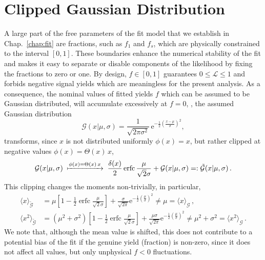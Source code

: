 \chapter{Clipped Gaussian Distribution}
\label{chap:apdx_clipgaus}
A large part of the free parameters of the fit model that we establish in Chap.~\ref{chap:fit} are fractions, such as $f_1$ and $f_s$, which are physically constrained to the interval $[0,1]$.
These boundaries enhance the numerical stability of the fit and makes it easy to separate or disable components of the likelihood by fixing the fractions to zero or one.
By design, $f \in [0,1]$ guarantees $0 \le \mathcal{L} \le 1$ and forbids negative signal yields which are meaningless for the present analysis.
As a consequence, the nominal values of fitted yields $f$ which can be assumed to be Gaussian distributed, will accumulate excessively at $f=0$, \ie{}, the assumed Gaussian distribution
\begin{equation*}
    \mathcal{G}(x|\mu,\sigma) = \frac{1}{\sqrt{2 \pi \sigma^2}} \, \mathrm{e}^{-\frac{1}{2} \left( \frac{x - \mu}{\sigma} \right)^2},
\end{equation*}
transforms, since $x$ is not distributed uniformly $\phi(x)=x$, but rather clipped at negative values $\phi(x) = \Theta(x) \, x$,
\begin{equation*}
    \mathcal{G}(x|\mu, \sigma) \; \xmapsto{\phi(x) = \Theta(x) \, x} \; \frac{\delta(x)}{2} \operatorname{erfc} \frac{\mu}{\sqrt{2}\sigma} + \mathcal{G}(x|\mu, \sigma) =: \tilde{\mathcal{G}}(x|\mu, \sigma) \,.
\end{equation*}
This clipping changes the moments non-trivially, in particular,
\begin{align}
    \langle x \rangle_{\tilde{\mathcal{G}}} &= \mu \left[ 1- \frac{1}{2} \operatorname{erfc} \frac{\mu}{\sqrt{2}\sigma} \right] + \frac{\sigma}{\sqrt{2 \pi}} \mathrm{e}^{-\frac{1}{2} \left( \frac{\mu}{\sigma} \right)^2} \neq \mu = \langle x \rangle_{\mathcal{G}} \,, \label{eq:apdx_clipgaus_mean} \\
    \langle x^2 \rangle_{\tilde{\mathcal{G}}} &= \left( \mu^2 + \sigma^2 \right) \left[ 1- \frac{1}{2} \operatorname{erfc} \frac{\mu}{\sqrt{2}\sigma} \right] + \frac{\mu \sigma}{\sqrt{2 \pi}} \mathrm{e}^{-\frac{1}{2} \left( \frac{\mu}{\sigma} \right)^2} \neq \mu^2 + \sigma^2 = \langle x^2 \rangle_{\mathcal{G}} \,. \label{eq:apdx_clipgaus_std}
\end{align}
We note that, although the mean value is shifted, this does not contribute to a potential bias of the fit if the genuine yield (fraction) is non-zero, since it does not affect all values, but only unphysical $f<0$ fluctuations.

